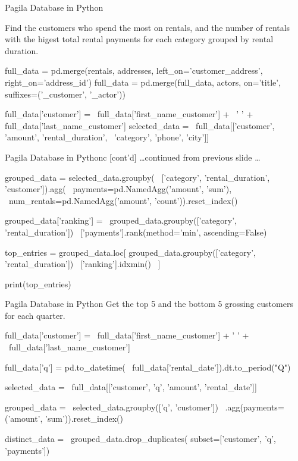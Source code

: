 \documentclass[ignorenonframetext,xcolor=x11names]{beamer}
\begin{document}
\begin{frame}[fragile]{Pagila Database in Python}

Find the customers who spend the most on rentals, and the number of rentals with the higest total rental payments for each category grouped by rental duration.

\scriptsize
\begin{pythoncode}
full_data = pd.merge(rentals, addresses, 
                 left_on='customer_address', 
                 right_on='address_id')
full_data = pd.merge(full_data, actors, 
                 on='title', 
                 suffixes=('_customer', '_actor'))

full_data['customer'] = \
   full_data['first_name_customer'] + \
   ' ' + full_data['last_name_customer']
selected_data = \
   full_data[['customer', 'amount', 'rental_duration', \
              'category', 'phone', 'city']]
\end{pythoncode}
\end{frame}
\begin{frame}[fragile]{Pagila Database in Pythonc \small [cont'd]}
\ldots continued from previous slide \ldots

\scriptsize
\begin{pythoncode}
grouped_data = selected_data.groupby( \
  ['category', 'rental_duration', 'customer']).agg( \
    payments=pd.NamedAgg('amount', 'sum'), \
    num_rentals=pd.NamedAgg('amount', 'count')).reset_index()
     
grouped_data['ranking'] = \
  grouped_data.groupby(['category', 'rental_duration']) \
    ['payments'].rank(method='min', ascending=False)

top_entries = grouped_data.loc[
    grouped_data.groupby(['category', 'rental_duration']) \
    ['ranking'].idxmin() \
  ]

print(top_entries)
\end{pythoncode}
\end{frame}

\begin{frame}[fragile]{Pagila Database in Python}
Get the top 5 and the bottom 5 grossing customers for each quarter.

\footnotesize
\begin{pythoncode}
full_data['customer'] = \
    full_data['first_name_customer'] + ' ' + \
    full_data['last_name_customer']

full_data['q'] = pd.to_datetime( \
    full_data['rental_date']).dt.to_period("Q")

selected_data = \
    full_data[['customer', 'q', 'amount', 'rental_date']]

grouped_data = \
    selected_data.groupby(['q', 'customer']) \
        .agg(payments=('amount', 'sum')).reset_index()

distinct_data = \
    grouped_data.drop_duplicates(
        subset=['customer', 'q', 'payments'])
\end{pythoncode}
\end{frame}
\end{document}
